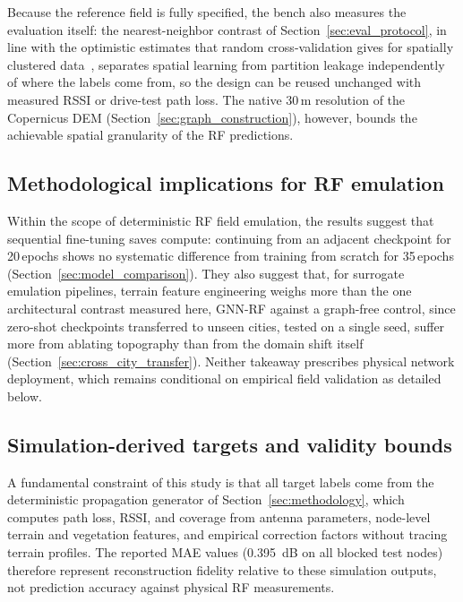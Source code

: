 \documentclass{ieeeaccess}
\begin{document}
Because the reference field is fully specified, the bench also measures the evaluation itself: the nearest-neighbor contrast of Section~\ref{sec:eval_protocol}, in line with the optimistic estimates that random cross-validation gives for spatially clustered data~\cite{meyer2021predicting}, separates spatial learning from partition leakage independently of where the labels come from, so the design can be reused unchanged with measured RSSI or drive-test path loss. The native 30\,m resolution of the Copernicus DEM (Section~\ref{sec:graph_construction}), however, bounds the achievable spatial granularity of the RF predictions.

\subsection{Methodological implications for RF emulation}

Within the scope of deterministic RF field emulation, the results suggest that sequential fine-tuning saves compute: continuing from an adjacent checkpoint for 20\,epochs shows no systematic difference from training from scratch for 35\,epochs (Section~\ref{sec:model_comparison}). They also suggest that, for surrogate emulation pipelines, terrain feature engineering weighs more than the one architectural contrast measured here, GNN-RF against a graph-free control, since zero-shot checkpoints transferred to unseen cities, tested on a single seed, suffer more from ablating topography than from the domain shift itself (Section~\ref{sec:cross_city_transfer}). Neither takeaway prescribes physical network deployment, which remains conditional on empirical field validation as detailed below.

\subsection{Simulation-derived targets and validity bounds}

A fundamental constraint of this study is that all target labels come from the deterministic propagation generator of Section~\ref{sec:methodology}, which computes path loss, RSSI, and coverage from antenna parameters, node-level terrain and vegetation features, and empirical correction factors without tracing terrain profiles. The reported MAE values (\SI{0.395}{\deci\bel} on all blocked test nodes) therefore represent reconstruction fidelity relative to these simulation outputs, not prediction accuracy against physical RF measurements.
\end{document}
